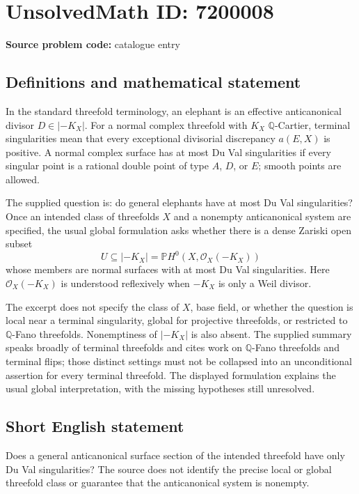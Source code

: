 \documentclass[11pt]{article}
\newcommand{\Q}{\mathbb{Q}}
\begin{document}
\section*{UnsolvedMath ID: 7200008}
\textbf{Source problem code:} catalogue entry
\subsection{Definitions and mathematical statement}
In the standard threefold terminology, an elephant is an effective anticanonical divisor \(D\in|-K_X|\). For a normal complex threefold with \(K_X\) \(\Q\)-Cartier, terminal singularities mean that every exceptional divisorial discrepancy \(a(E,X)\) is positive. A normal complex surface has at most Du Val singularities if every singular point is a rational double point of type \(A\), \(D\), or \(E\); smooth points are allowed.

The supplied question is: do general elephants have at most Du Val singularities? Once an intended class of threefolds \(X\) and a nonempty anticanonical system are specified, the usual global formulation asks whether there is a dense Zariski open subset
\[
 U\subseteq|-K_X|=\mathbb P H^0(X,\mathcal O_X(-K_X))
\]
whose members are normal surfaces with at most Du Val singularities. Here \(\mathcal O_X(-K_X)\) is understood reflexively when \(-K_X\) is only a Weil divisor.

The excerpt does not specify the class of \(X\), base field, or whether the question is local near a terminal singularity, global for projective threefolds, or restricted to \(\Q\)-Fano threefolds. Nonemptiness of \(|-K_X|\) is also absent. The supplied summary speaks broadly of terminal threefolds and cites work on \(\Q\)-Fano threefolds and terminal flips; those distinct settings must not be collapsed into an unconditional assertion for every terminal threefold. The displayed formulation explains the usual global interpretation, with the missing hypotheses still unresolved.
\subsection{Short English statement}
Does a general anticanonical surface section of the intended threefold have only Du Val singularities? The source does not identify the precise local or global threefold class or guarantee that the anticanonical system is nonempty.
\end{document}
